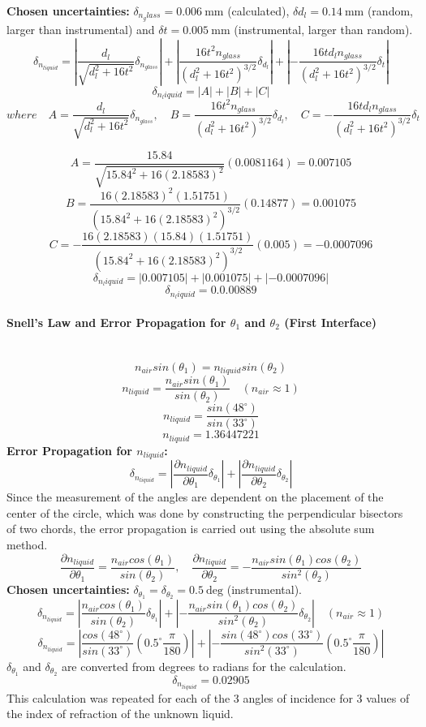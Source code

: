 \documentclass[12pt]{article}
\begin{document}
\textbf{Chosen uncertainties:} $\delta_{n_glass} = 0.006~\mathrm{mm}$ (calculated), $\delta d_l = 0.14~\mathrm{mm}$ (random, larger than instrumental) and $\delta t = 0.005~\mathrm{mm}$ (instrumental, larger than random).
\[
\delta_{n_{liquid}} = 
\left| \frac{d_l}{\sqrt{d_l^2+16t^2}} \delta_{n_{glass}} \right| +
\left| \frac{16t^2 n_{glass}}{(d_l^2+16t^2)^{3/2}} \delta_{d_l} \right| +
\left| -\frac{16t d_l n_{glass}}{(d_l^2+16t^2)^{3/2}} \delta_t \right|
\]
\[\delta_{n_liquid}= |A| + |B| + |C|\]
\[where \quad A = \frac{d_l}{\sqrt{d_l^2+16t^2}} \delta_{n_{glass}}, \quad B = \frac{16t^2 n_{glass}}{(d_l^2+16t^2)^{3/2}} \delta_{d_l}, \quad C = -\frac{16t d_l n_{glass}}{(d_l^2+16t^2)^{3/2}} \delta_t\]

\[A = \frac{15.84}{\sqrt{15.84^2 + 16(2.18583)^2}} (0.0081164)=0.007105\]
\[B = \frac{16(2.18583)^2 (1.51751)}{(15.84^2 + 16(2.18583)^2)^{3/2}} (0.14877)=0.001075\]
\[C = -\frac{16(2.18583)(15.84)(1.51751)}{(15.84^2 + 16(2.18583)^2)^{3/2}} (0.005)=-0.0007096\]
\[\delta_{n_liquid}= |0.007105| + |0.001075| + |-0.0007096|\]
\[\delta_{n_liquid}= 0.0.00889\]

\paragraph{Snell's Law and Error Propagation for $\theta_1$ and $\theta_2$ (First Interface)} \mbox{}\\
\[n_{air}sin(\theta_1)=n_{liquid}sin(\theta_2) \]
\[n_{liquid} = \frac{n_{air}sin(\theta_1)}{sin(\theta_2)} \quad (n_{air} \approx 1)\]
\[n_{liquid} = \frac{sin(48^\circ)}{sin(33^\circ)}\]
\[n_{liquid} = 1.36447221\]
\textbf{Error Propagation for $n_{liquid}$:}
\[\delta_{n_{liquid}} = \left | \frac{\partial n_{liquid}}{\partial \theta_1}\delta_{\theta_1} \right |+ \left | \frac{\partial n_{liquid}}{\partial \theta_2}\delta_{\theta_2} \right |\]
Since the measurement of the angles are dependent on the placement of the center of the circle, which was done by constructing the perpendicular bisectors of two chords, the error propagation is carried out using the absolute sum method.
\[\frac{\partial n_{liquid}}{\partial \theta_1} = \frac{n_{air}cos(\theta_1)}{sin(\theta_2)}, \quad \frac{\partial n_{liquid}}{\partial \theta_2} = -\frac{n_{air}sin(\theta_1)cos(\theta_2)}{sin^2(\theta_2)}\]
\textbf{Chosen uncertainties:} $\delta_{\theta_1} = \delta_{\theta_2} = 0.5~\mathrm{deg}$ (instrumental).
\[\delta_{n_{liquid}} = \left|\frac{n_{air}cos(\theta_1)}{sin(\theta_2)} \delta_{\theta_1}\right| + \left| -\frac{n_{air}sin(\theta_1)cos(\theta_2)}{sin^2(\theta_2)} \delta_{\theta_2}\right| \quad (n_{air} \approx 1)\]
\[\delta_{n_{liquid}} = \left|\frac{cos(48^\circ)}{sin(33^\circ)} \left (0.5^\circ \frac{\pi}{180}\right )\right| + \left| -\frac{sin(48^\circ)cos(33^\circ)}{sin^2(33^\circ)} \left (0.5^\circ \frac{\pi}{180}\right )\right|\]
$\delta_{\theta_1}$ and $\delta_{\theta_2}$ are converted from degrees to radians for the calculation.
\[\delta_{n_{liquid}} = 0.02905\]
This calculation was repeated for each of the 3 angles of incidence for 3 values of the index of refraction of the unknown liquid.
\end{document}
